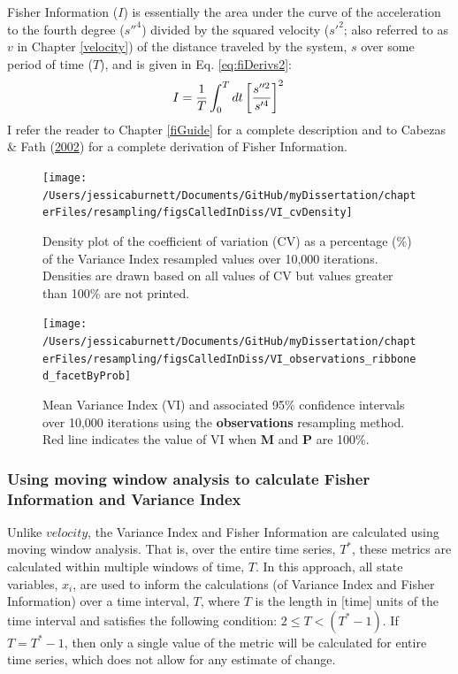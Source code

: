 \documentclass[12pt,twoside,openany]{reedthesis}
\begin{document}
Fisher Information (\(I\)) is essentially the area under the curve of the acceleration to the fourth degree (\(s''^4\)) divided by the squared velocity (\(s'^2\); also referred to as \(v\) in Chapter \ref{velocity}) of the distance traveled by the system, \(s\) over some period of time (\(T\)), and is given in Eq. \eqref{eq:fiDerivs2}:
\begin{equation}   
    I = \frac{1}{T} \int_0^T dt\left[\frac{s''^2}{s'^4}\right]^2 \\  
  \label{eq:fiDerivs2}  
\end{equation}
I refer the reader to Chapter \ref{fiGuide} for a complete description and to Cabezas \& Fath (\protect\hyperlink{ref-cabezas_towards_2002}{2002}) for a complete derivation of Fisher Information.

\begin{figure}
\texttt{[image: /Users/jessicaburnett/Documents/GitHub/myDissertation/chapterFiles/resampling/figsCalledInDiss/VI\_cvDensity]} \caption{Density plot of the coefficient of variation (CV) as a percentage (\%) of the Variance Index resampled values over 10,000 iterations. Densities are drawn based on all values of CV but values greater than 100\% are not printed.}\label{fig:viCV}
\end{figure}

\begin{figure}
\texttt{[image: /Users/jessicaburnett/Documents/GitHub/myDissertation/chapterFiles/resampling/figsCalledInDiss/VI\_observations\_ribboned\_facetByProb]} \caption{Mean Variance Index (VI) and associated 95\% confidence intervals over 10,000 iterations using the \textbf{observations} resampling method. Red line indicates the value of VI when \textbf{M} and \textbf{P} are 100\%.}\label{fig:viResamp}
\end{figure}
\hypertarget{using-moving-window-analysis-to-calculate-fisher-information-and-variance-index}{%
\subsubsection{Using moving window analysis to calculate Fisher Information and Variance Index}\label{using-moving-window-analysis-to-calculate-fisher-information-and-variance-index}}

Unlike \(velocity\), the Variance Index and Fisher Information are calculated using moving window analysis. That is, over the entire time series, \(T^*\), these metrics are calculated within multiple windows of time, \(T\). In this approach, all state variables, \(x_i\), are used to inform the calculations (of Variance Index and Fisher Information) over a time interval, \(T\), where \(T\) is the length in {[}time{]} units of the time interval and satisfies the following condition: \(2\leq T < (T^*-1)\). If \(T = T^*-1\), then only a single value of the metric will be calculated for entire time series, which does not allow for any estimate of change.
\end{document}
